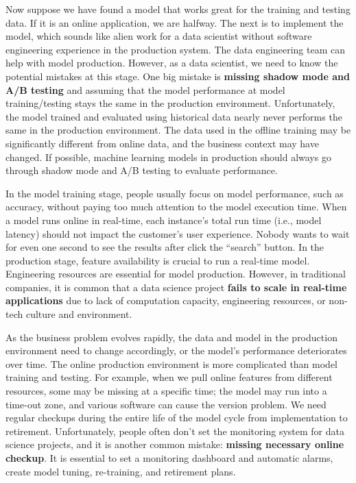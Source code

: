\documentclass[12pt,]{krantz}
\begin{document}
Now suppose we have found a model that works great for the training and testing data. If it is an online application, we are halfway. The next is to implement the model, which sounds like alien work for a data scientist without software engineering experience in the production system. The data engineering team can help with model production. However, as a data scientist, we need to know the potential mistakes at this stage. One big mistake is \textbf{missing shadow mode and A/B testing} and assuming that the model performance at model training/testing stays the same in the production environment. Unfortunately, the model trained and evaluated using historical data nearly never performs the same in the production environment. The data used in the offline training may be significantly different from online data, and the business context may have changed. If possible, machine learning models in production should always go through shadow mode and A/B testing to evaluate performance.

In the model training stage, people usually focus on model performance, such as accuracy, without paying too much attention to the model execution time. When a model runs online in real-time, each instance's total run time (i.e., model latency) should not impact the customer's user experience. Nobody wants to wait for even one second to see the results after click the ``search'' button. In the production stage, feature availability is crucial to run a real-time model. Engineering resources are essential for model production. However, in traditional companies, it is common that a data science project \textbf{fails to scale in real-time applications} due to lack of computation capacity, engineering resources, or non-tech culture and environment.

As the business problem evolves rapidly, the data and model in the production environment need to change accordingly, or the model's performance deteriorates over time. The online production environment is more complicated than model training and testing. For example, when we pull online features from different resources, some may be missing at a specific time; the model may run into a time-out zone, and various software can cause the version problem. We need regular checkups during the entire life of the model cycle from implementation to retirement. Unfortunately, people often don't set the monitoring system for data science projects, and it is another common mistake: \textbf{missing necessary online checkup}. It is essential to set a monitoring dashboard and automatic alarms, create model tuning, re-training, and retirement plans.
\end{document}
